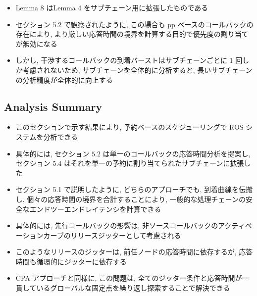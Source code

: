 \begin{frame}{}
    \begin{itemize}
        \item Lemma 8 はLemma 4 をサブチェーン用に拡張したものである
        \item セクション 5.2 で観察されたように, この場合も pp ベースのコールバックの存在により, より厳しい応答時間の境界を計算する目的で優先度の割り当てが無効になる
        \item しかし, 干渉するコールバックの到着バーストはサブチェーンごとに 1 回しか考慮されないため, サブチェーンを全体的に分析すると, 長いサブチェーンの分析精度が全体的に向上する
    \end{itemize}
\end{frame}


\subsection{Analysis Summary}
\label{ssec: analysis summary}

\begin{frame}{}
    \begin{itemize}
        \item このセクションで示す結果により, 予約ベースのスケジューリングで ROS システムを分析できる
        \item 具体的には, セクション $5.2$ は単一のコールバックの応答時間分析を提案し, セクション $5.4$ はそれを単一の予約に割り当てられたサブチェーンに拡張した
        \item セクション 5.1 で説明したように, どちらのアプローチでも, 到着曲線を伝搬し, 個々の応答時間の境界を合計することにより, 一般的な処理チェーンの安全なエンドツーエンドレイテンシを計算できる
        \item 具体的には, 先行コールバックの影響は, 非ソースコールバックのアクティベーションカーブのリリースジッターとして考慮される
        \item このようなリリースのジッターは, 前任ノードの応答時間に依存するが, 応答時間も循環的にジッターに依存する
        \item CPA アプローチと同様に, この問題は, 全てのジッター条件と応答時間が一貫しているグローバルな固定点を繰り返し探索することで解決できる
    \end{itemize}
\end{frame}
